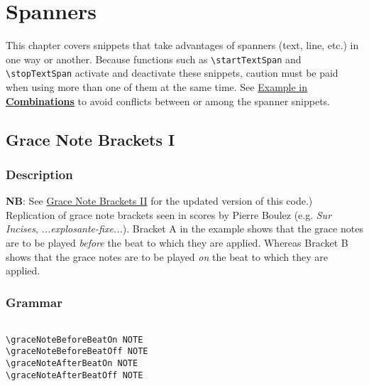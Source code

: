 

\chapter {Spanners}

This chapter covers snippets that take advantages of spanners (text, line, etc.) in one way or another. Because functions such as \verb|\startTextSpan| and \verb|\stopTextSpan| activate and deactivate these snippets, caution must be paid when using more than one of them at the same time. See \hyperref[sec:comb_spanners]{Example in \textbf{Combinations}} to avoid conflicts between or among the spanner snippets.

\section {Grace Note Brackets I}
\hfill
{}
\hfill

\subsection{Description}
\textbf{NB}: See \hyperref[sec:gracenote2]{Grace Note Brackets II} for the updated version of this code.)
Replication of grace note brackets seen in scores by Pierre Boulez (e.g. \textit{Sur Incises}\autocite{RN1738}, \textit{...explosante-fixe...}\autocite{RN1737}). Bracket A in the example shows that the grace notes are to be played \textit{before} the beat to which they are applied. Whereas Bracket B shows that the grace notes are to be played \textit{on} the beat to which they are applied.

\subsection{Grammar}
\begin{verbatim}

\graceNoteBeforeBeatOn NOTE
\graceNoteBeforeBeatOff NOTE
\graceNoteAfterBeatOn NOTE
\graceNoteAfterBeatOff NOTE

\end{verbatim}

